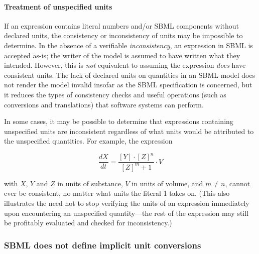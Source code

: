 \paragraph{Treatment of unspecified units}

If an expression contains literal numbers and/or SBML components
without declared units, the consistency or inconsistency of units
may be impossible to determine.  In the absence of a verifiable
\emph{inconsistency}, an expression in SBML is accepted as-is; the
writer of the model is assumed to have written what they intended.
However, this is \emph{not} equivalent to assuming the expression
\emph{does} have consistent units.  The lack of declared units on
quantities in an SBML model does not render the model invalid
insofar as the SBML specification is concerned, but it reduces the
types of consistency checks and useful operations (such as
conversions and translations) that software systems can perform.

In some cases, it may be possible to determine that expressions
containing unspecified units are inconsistent regardless of what
units would be attributed to the unspecified quantities.  For
example, the expression
\begin{linenomath}
  \begin{equation*}
    \frac{dX}{dt} = \frac{[Y] \cdot [Z]^n}{[Z]^m + 1} \cdot V
  \end{equation*}
\end{linenomath}
with $X$, $Y$ and $Z$ in units of substance, $V$ in
units of volume, and $m \neq n$, cannot ever be consistent, no
matter what units the literal 1 takes on.  (This also illustrates
the need not to stop verifying the units of an expression
immediately upon encountering an unspecified quantity---the rest
of the expression may still be profitably evaluated and checked
for inconsistency.)


\subsubsection{SBML does not define implicit unit conversions}
\label{sec:no-implicit-conversions}

